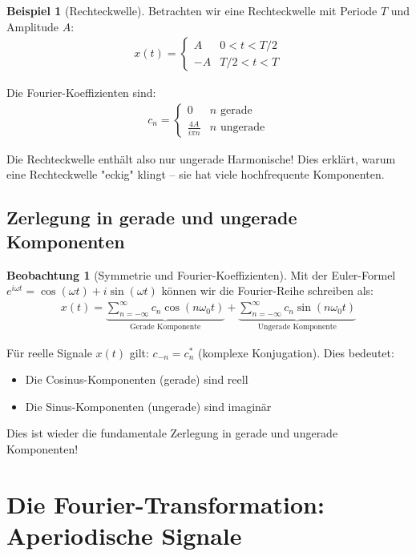 ﻿\documentclass[a4paper,12pt]{report}
\theoremstyle{definition}
\newtheorem{beispiel}{Beispiel}
\newtheorem{beobachtung}{Beobachtung}
\begin{document}
	\begin{beispiel}[Rechteckwelle]
		Betrachten wir eine Rechteckwelle mit Periode $T$ und Amplitude $A$:
		\begin{align}
			x(t) = \begin{cases} A & 0 < t < T/2 \\ -A & T/2 < t < T \end{cases}
		\end{align}
		
		Die Fourier-Koeffizienten sind:
		\begin{align}
			c_n = \begin{cases} 0 & n \text{ gerade} \\ \frac{4A}{i\pi n} & n \text{ ungerade} \end{cases}
		\end{align}
		
		Die Rechteckwelle enthält also nur ungerade Harmonische! Dies erklärt, warum eine Rechteckwelle "eckig" klingt -- sie hat viele hochfrequente Komponenten.
	\end{beispiel}
	
	\subsection{Zerlegung in gerade und ungerade Komponenten}
	
	\begin{beobachtung}[Symmetrie und Fourier-Koeffizienten]
		Mit der Euler-Formel $e^{i\omega t} = \cos(\omega t) + i\sin(\omega t)$ können wir die Fourier-Reihe schreiben als:
		\begin{align}
			x(t) = \underbrace{\sum_{n=-\infty}^{\infty} c_n \cos(n\omega_0 t)}_{\text{Gerade Komponente}} + \underbrace{\sum_{n=-\infty}^{\infty} c_n \sin(n\omega_0 t)}_{\text{Ungerade Komponente}}
		\end{align}
		
		Für reelle Signale $x(t)$ gilt: $c_{-n} = c_n^*$ (komplexe Konjugation). Dies bedeutet:
		\begin{itemize}
			\item[-] Die Cosinus-Komponenten (gerade) sind reell
			\item[-] Die Sinus-Komponenten (ungerade) sind imaginär
		\end{itemize}
		
		Dies ist wieder die fundamentale Zerlegung in gerade und ungerade Komponenten!
	\end{beobachtung}
	
	\section{Die Fourier-Transformation: Aperiodische Signale}
	
\end{document}
